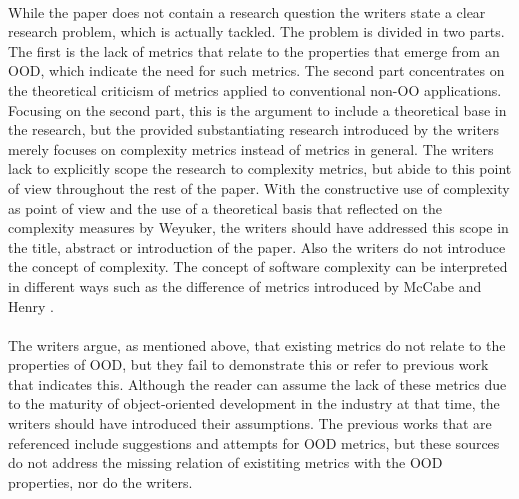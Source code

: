 \paragraph{}
While the paper does not contain a research question the writers state a clear research problem, which is actually tackled.
The problem is divided in two parts. The first is the lack of metrics that relate to the properties that emerge from an
OOD, which indicate the need for such metrics. The second part concentrates on the theoretical criticism of metrics
applied to conventional non-OO applications. Focusing on the second part, this is the argument to include a theoretical base in the
research, but the provided substantiating research introduced by the writers merely focuses on complexity metrics instead
of metrics in general. The writers lack to explicitly scope the research to complexity metrics, but abide to this
point of view throughout the rest of the paper. With the constructive use of complexity as point of view and the use of
a theoretical basis that reflected on the complexity measures by Weyuker, the writers should have addressed this scope in
the title, abstract or introduction of the paper. Also the writers do not introduce the concept of complexity. The concept of
software complexity can be interpreted in different ways such as the difference of metrics introduced by McCabe \autocite{ICSE-1976-McCabe}
and Henry \autocite{HENRY}.

\paragraph{}
The writers argue, as mentioned above, that existing metrics do not relate to the properties of OOD, but they fail
to demonstrate this or refer to previous work that indicates this. Although the reader can assume the lack of these
metrics due to the maturity of object-oriented development in the industry at that time, the writers should have introduced
their assumptions. The previous works that are referenced include suggestions and attempts for OOD metrics, but these
sources do not address the missing relation of existiting metrics with the OOD properties, nor do the writers.

